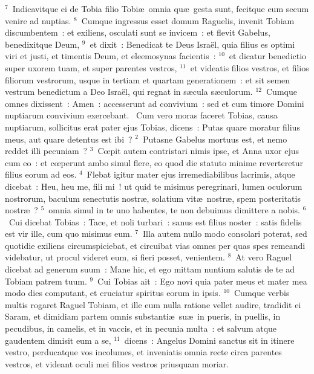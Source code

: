 ${}^{7}$~Indicavitque ei de Tobia filio Tobi\ae\ omnia qu\ae\ gesta sunt, fecitque eum secum venire ad nuptias.
${}^{8}$~Cumque ingressus esset domum Raguelis, invenit Tobiam discumbentem~: et exiliens, osculati sunt se invicem~: et flevit Gabelus, benedixitque Deum,
${}^{9}$~et dixit~: Benedicat te Deus Isra\"el, quia filius es optimi viri et justi, et timentis Deum, et eleemosynas facientis~:
${}^{10}$~et dicatur benedictio super uxorem tuam, et super parentes vestros,
${}^{11}$~et videatis filios vestros, et filios filiorum vestrorum, usque in tertiam et quartam generationem~: et sit semen vestrum benedictum a Deo Isra\"el, qui regnat in s\ae cula s\ae culorum.
${}^{12}$~Cumque omnes dixissent~: Amen~: accesserunt ad convivium~: sed et cum timore Domini nuptiarum convivium exercebant.
~\lettrine[lines=10,image=true,loversize=0.05,lraise=-0.03]{C}{}um vero moras faceret Tobias, causa nuptiarum, sollicitus erat pater ejus Tobias, dicens~: Putas quare moratur filius meus, aut quare detentus est ibi~?
${}^{2}$~Putasne Gabelus mortuus est, et nemo reddet illi pecuniam~?
${}^{3}$~Cœpit autem contristari nimis ipse, et Anna uxor ejus cum eo~: et cœperunt ambo simul flere, eo quod die statuto minime reverteretur filius eorum ad eos.
${}^{4}$~Flebat igitur mater ejus irremediabilibus lacrimis, atque dicebat~: Heu, heu me, fili mi~! ut quid te misimus peregrinari, lumen oculorum nostrorum, baculum senectutis nostr\ae , solatium vit\ae\ nostr\ae , spem posteritatis nostr\ae~?
${}^{5}$~omnia simul in te uno habentes, te non debuimus dimittere a nobis.
${}^{6}$~Cui dicebat Tobias~: Tace, et noli turbari~: sanus est filius noster~: satis fidelis est vir ille, cum quo misimus eum.
${}^{7}$~Illa autem nullo modo consolari poterat, sed quotidie exiliens circumspiciebat, et circuibat vias omnes per quas spes remeandi videbatur, ut procul videret eum, si fieri posset, venientem.
${}^{8}$~At vero Raguel dicebat ad generum suum~: Mane hic, et ego mittam nuntium salutis de te ad Tobiam patrem tuum.
${}^{9}$~Cui Tobias ait~: Ego novi quia pater meus et mater mea modo dies computant, et cruciatur spiritus eorum in ipsis.
${}^{10}$~Cumque verbis multis rogaret Raguel Tobiam, et ille eum nulla ratione vellet audire, tradidit ei Saram, et dimidiam partem omnis substanti\ae\ su\ae\ in pueris, in puellis, in pecudibus, in camelis, et in vaccis, et in pecunia multa~: et salvum atque gaudentem dimisit eum a se,
${}^{11}$~dicens~: Angelus Domini sanctus sit in itinere vestro, perducatque vos incolumes, et inveniatis omnia recte circa parentes vestros, et videant oculi mei filios vestros priusquam moriar.
